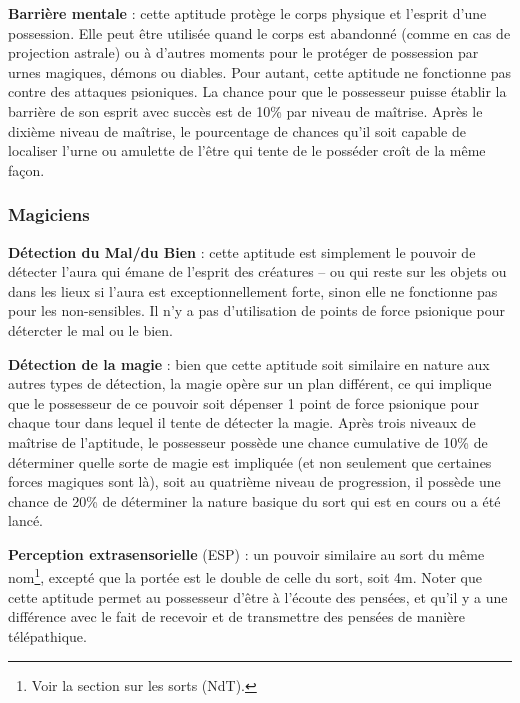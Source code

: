 \documentclass[11pt]{article}
\begin{document}
{\bigskip

\textbf{Barrière mentale} : cette aptitude protège le corps physique et l'esprit d'une possession. Elle peut être utilisée quand le corps est abandonné (comme en cas de projection astrale) ou à d'autres moments pour le protéger de possession par urnes magiques, démons ou diables. Pour autant, cette aptitude ne fonctionne pas contre des attaques psioniques. La chance pour que le possesseur puisse établir la barrière de son esprit avec succès est de 10\% par niveau de maîtrise. Après le dixième niveau de maîtrise, le pourcentage de chances qu'il soit capable de localiser l'urne ou amulette de l'être qui tente de le posséder croît de la même façon.

\subsubsection*{Magiciens}

\textbf{Détection du Mal/du Bien} : cette aptitude est simplement le pouvoir de détecter l'aura qui émane de l'esprit des créatures -- ou qui reste sur les objets ou dans les lieux si l'aura est exceptionnellement forte, sinon elle ne fonctionne pas pour les non-sensibles.%
Il n'y a pas d'utilisation de points de force psionique pour détercter le mal ou le bien.

\bigskip

\textbf{Détection de la magie} : bien que cette aptitude soit similaire en nature aux autres types de détection, la magie opère sur un plan différent, ce qui implique que le possesseur de ce pouvoir soit dépenser 1 point de force psionique pour chaque tour dans lequel il tente de détecter la magie. Après trois niveaux de maîtrise de l'aptitude, le possesseur possède une chance cumulative de 10\% de déterminer quelle sorte de magie est impliquée (et non seulement que certaines forces magiques sont là), soit au quatrième niveau de progression, il possède une chance de 20\% de déterminer la nature basique du sort qui est en cours ou a été lancé.

\bigskip

\textbf{Perception extrasensorielle} (ESP) : un pouvoir similaire au sort du même nom\footnote{Voir la section sur les sorts (NdT).}, excepté que la portée est le double de celle du sort, soit 4m. Noter que cette aptitude permet au possesseur d'être \og à l'écoute \fg{} des pensées, et qu'il y a une différence avec le fait de recevoir et de transmettre des pensées de manière télépathique.

}
\end{document}
